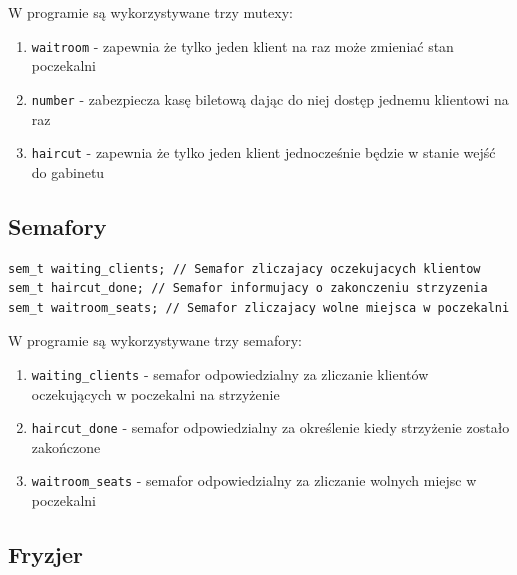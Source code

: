 \documentclass[12pt,a4paper]{article}
\begin{document}
	W programie są wykorzystywane trzy mutexy:
	\begin{enumerate}
		\item \texttt{waitroom} - zapewnia że tylko jeden klient na raz
			może zmieniać stan poczekalni
		\item \texttt{number} - zabezpiecza kasę biletową dając do niej
			dostęp jednemu klientowi na raz
		\item \texttt{haircut} - zapewnia że tylko jeden klient
			jednocześnie będzie w stanie wejść do gabinetu
	\end{enumerate}
	
	\subsection{Semafory}
	
	\begin{center}
		\begin{minipage}{0.8\linewidth}
\begin{lstlisting}[caption = Deklaracje semaforów.]
sem_t waiting_clients; // Semafor zliczajacy oczekujacych klientow
sem_t haircut_done; // Semafor informujacy o zakonczeniu strzyzenia
sem_t waitroom_seats; // Semafor zliczajacy wolne miejsca w poczekalni
\end{lstlisting}
		\end{minipage}
	\end{center}
	
	W programie są wykorzystywane trzy semafory:
	\begin{enumerate}
		\item \texttt{waiting{\_}clients} - semafor odpowiedzialny za
			zliczanie klientów oczekujących w poczekalni na strzyżenie
		\item \texttt{haircut{\_}done} - semafor odpowiedzialny za
			określenie kiedy strzyżenie zostało zakończone
		\item \texttt{waitroom{\_}seats} - semafor odpowiedzialny za
			zliczanie wolnych miejsc w poczekalni
	\end{enumerate}
	
	\subsection{Fryzjer}	
	
\end{document}
